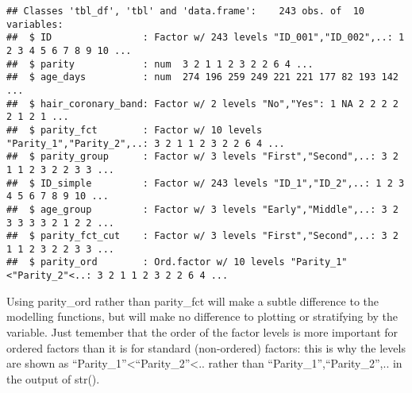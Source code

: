 \documentclass[
]{article}
\newenvironment{Shaded}{\begin{snugshade}}{\end{snugshade}}
\newcommand{\DataTypeTok}[1]{\textcolor[rgb]{0.13,0.29,0.53}{#1}}
\newcommand{\DecValTok}[1]{\textcolor[rgb]{0.00,0.00,0.81}{#1}}
\newcommand{\KeywordTok}[1]{\textcolor[rgb]{0.13,0.29,0.53}{\textbf{#1}}}
\newcommand{\NormalTok}[1]{#1}
\newcommand{\OperatorTok}[1]{\textcolor[rgb]{0.81,0.36,0.00}{\textbf{#1}}}
\newcommand{\OtherTok}[1]{\textcolor[rgb]{0.56,0.35,0.01}{#1}}
\newcommand{\StringTok}[1]{\textcolor[rgb]{0.31,0.60,0.02}{#1}}
\begin{document}
\begin{Shaded}
\end{Shaded}

\begin{verbatim}
## Classes 'tbl_df', 'tbl' and 'data.frame':    243 obs. of  10 variables:
##  $ ID                : Factor w/ 243 levels "ID_001","ID_002",..: 1 2 3 4 5 6 7 8 9 10 ...
##  $ parity            : num  3 2 1 1 2 3 2 2 6 4 ...
##  $ age_days          : num  274 196 259 249 221 221 177 82 193 142 ...
##  $ hair_coronary_band: Factor w/ 2 levels "No","Yes": 1 NA 2 2 2 2 2 1 2 1 ...
##  $ parity_fct        : Factor w/ 10 levels "Parity_1","Parity_2",..: 3 2 1 1 2 3 2 2 6 4 ...
##  $ parity_group      : Factor w/ 3 levels "First","Second",..: 3 2 1 1 2 3 2 2 3 3 ...
##  $ ID_simple         : Factor w/ 243 levels "ID_1","ID_2",..: 1 2 3 4 5 6 7 8 9 10 ...
##  $ age_group         : Factor w/ 3 levels "Early","Middle",..: 3 2 3 3 3 3 2 1 2 2 ...
##  $ parity_fct_cut    : Factor w/ 3 levels "First","Second",..: 3 2 1 1 2 3 2 2 3 3 ...
##  $ parity_ord        : Ord.factor w/ 10 levels "Parity_1"<"Parity_2"<..: 3 2 1 1 2 3 2 2 6 4 ...
\end{verbatim}

Using parity\_ord rather than parity\_fct will make a subtle difference
to the modelling functions, but will make no difference to plotting or
stratifying by the variable. Just temember that the order of the factor
levels is more important for ordered factors than it is for standard
(non-ordered) factors: this is why the levels are shown as
``Parity\_1''\textless{}``Parity\_2''\textless.. rather than
``Parity\_1'',``Parity\_2'',.. in the output of str().
\end{document}
